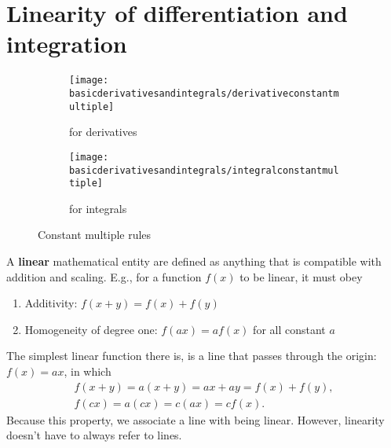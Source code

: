 \section{Linearity of differentiation and integration}
\label{sec:diff_int_linearity}

\begin{figure}[ht]
    \centering
    \begin{subfigure}[t]{0.75\textwidth}
        \centering
        \texttt{[image: basicderivativesandintegrals/derivativeconstantmultiple]}
        \caption{for derivatives}
        \label{fig:derivativesconstantmultiple}
    \end{subfigure}
    \begin{subfigure}[b]{0.36\textwidth}
        \centering
        \texttt{[image: basicderivativesandintegrals/integralconstantmultiple]}
        \caption{for integrals}
        \label{fig:integralsconstantmultiple}
    \end{subfigure}
    \caption{Constant multiple rules}
\end{figure}

A \textbf{linear} mathematical entity are defined as anything that is compatible with addition and scaling. E.g., for a function $f(x)$ to be linear, it must obey
\begin{enumerate}[noitemsep]
    \item Additivity: $f(x + y) = f(x) + f(y)$
    \item Homogeneity of degree one: $f(ax) = af(x)$ for all constant $a$
\end{enumerate}
The simplest linear function there is, is a line that passes through the origin: $f(x) = ax$, in which
\begin{gather}
    f(x + y) = a(x + y) = ax + ay = f(x) + f(y), \\
    f(cx) = a(cx) = c(ax) = cf(x).
\end{gather}
Because this property, we associate a line with being linear. However, linearity doesn't have to always refer to lines.


